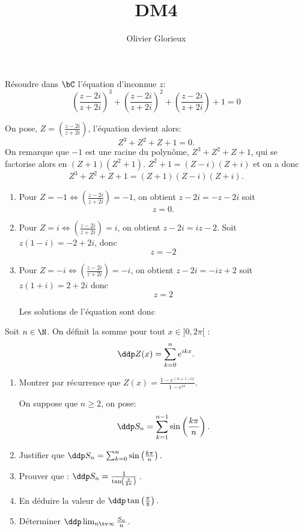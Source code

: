 \documentclass[a4paper, 11pt,reqno]{article}
\author{Olivier Glorieux}
\begin{document}
\title{DM4 \\
}
\begin{exercice}
Résoudre dans $\bC$ l'équation d'inconnue $z$: 
$$\left(\frac{z-2i}{z+2i}\right)^3+\left(\frac{z-2i}{z+2i}\right)^2+\left(\frac{z-2i}{z+2i}\right)+1=0$$
\end{exercice}


\begin{correction}
On pose, $Z =\left(\frac{z-2i}{z+2i}\right)$, l'équation devient alors: 
$$Z^3+Z^2+Z+1=0.$$
On  remarque que $-1$ est une racine du polynôme,   $Z^3+Z^2+Z+1$, qui se factorise alors en 
$(Z+1)(Z^2+1)$. $Z^2+1 =(Z-i)(Z+i)$ et on  a donc 
$$Z^3+Z^2+Z+1 =(Z+1)(Z-i)(Z+i).$$

\begin{enumerate}
\item Pour $Z=-1 \Longleftrightarrow \left(\frac{z-2i}{z+2i}\right)=-1$, on obtient 
$z-2i =-z-2i$ soit $$z=0.$$
\item Pour $Z=i \Longleftrightarrow \left(\frac{z-2i}{z+2i}\right)=i$, on obtient 
$z-2i =iz-2$. Soit $z(1-i) = -2+2i$, donc 
$$z=-2$$


\item Pour $Z=-i \Longleftrightarrow \left(\frac{z-2i}{z+2i}\right)=-i$, on obtient 
$z-2i =-iz+2$ soit $z(1+i) =2+2i$ donc 
$$z=2$$



Les solutions de l'équation sont donc 

\end{enumerate}
\end{correction}


\begin{exercice}
 Soit  $n\in \N$. On définit la somme pour tout $x \in ]0, 2\pi[$ :
$$\ddp Z(x) =\sum_{k=0}^n e^{ikx}.$$
\begin{enumerate}
\item Montrer par récurrence que $Z(x) = \frac{1-e^{(n+1)ix}}{1-e^{ix}}$.

On suppose que $n\geq 2$, on pose: 
$$\ddp S_n = \sum_{k=1}^{n-1} \sin \left( \frac{k\pi}{n}\right).$$
\item Justifier que $\ddp S_n = \sum_{k=0}^{n} \sin \left( \frac{k\pi}{n}\right).$\\
\item Prouver que : $\ddp S_n = \frac{1}{ \tan \left( \frac{\pi}{2n}\right)}\, $.\\
\item En déduire la valeur de $\ddp \tan \left( \frac{\pi}{8}\right).$\\
\item Déterminer $\ddp \lim_{n\tv \infty} \frac{S_n}{n}\, .$
\end{enumerate}
\end{exercice}
\end{document}
